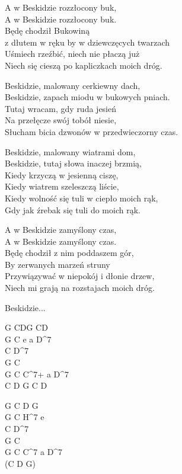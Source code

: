 
\begin{text}
    A w Beskidzie rozzłocony buk,\\
    A w Beskidzie rozzłocony buk.\\
    Będę chodził Bukowiną\\
	z dłutem w ręku by w dziewczęcych twarzach \\
    Uśmiech rzeźbić, niech nie płaczą już\\
    Niech się cieszą po kapliczkach moich dróg.

    \vin Beskidzie, malowany cerkiewny dach,\\
    \vin Beskidzie, zapach miodu w bukowych pniach.\\
    \vin Tutaj wracam, gdy ruda jesień\\
    \vin Na przełęcze swój tobół niesie,\\
    \vin Słucham bicia dzwonów w przedwieczorny czas.

    \vin Beskidzie, malowany wiatrami dom,\\
    \vin Beskidzie, tutaj słowa inaczej brzmią,\\
    \vin Kiedy krzyczą w jesienną ciszę,\\
    \vin Kiedy wiatrem szeleszczą liście,\\
    \vin Kiedy wolność się tuli w ciepło moich rąk,\\
    \vin Gdy jak źrebak się tuli do moich rąk.

    A w Beskidzie zamyślony czas,\\
    A w Beskidzie zamyślony czas.\\
    Będę chodził z nim poddaszem gór,\\
    By zerwanych marzeń struny\\
    Przywiązywać w niepokój i dłonie drzew,\\
    Niech mi grają na rozstajach moich dróg.

    \vin Beskidzie...
\end{text}
\begin{chord}
    G CDG CD\\
	G C e a D^7\\
	C D^7\\
	G C\\
	G C C^{7+} a D^7\\
	C D G C D
	
	G C D G\\
	G C H^7 e\\
	C D^7\\
	G C\\
	G C C^7 a D^7\\
	(C D G)
	
\end{chord}